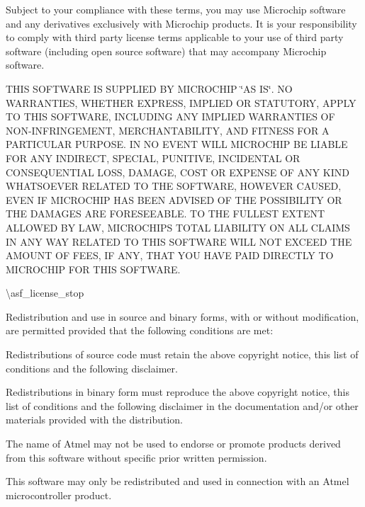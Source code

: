 Subject to your compliance with these terms, you may use Microchip software and any derivatives exclusively with Microchip products. It is your responsibility to comply with third party license terms applicable to your use of third party software (including open source software) that may accompany Microchip software.

T\+H\+IS S\+O\+F\+T\+W\+A\+RE IS S\+U\+P\+P\+L\+I\+ED BY M\+I\+C\+R\+O\+C\+H\+IP \char`\"{}\+A\+S I\+S\char`\"{}. NO W\+A\+R\+R\+A\+N\+T\+I\+ES, W\+H\+E\+T\+H\+ER E\+X\+P\+R\+E\+SS, I\+M\+P\+L\+I\+ED OR S\+T\+A\+T\+U\+T\+O\+RY, A\+P\+P\+LY TO T\+H\+IS S\+O\+F\+T\+W\+A\+RE, I\+N\+C\+L\+U\+D\+I\+NG A\+NY I\+M\+P\+L\+I\+ED W\+A\+R\+R\+A\+N\+T\+I\+ES OF N\+O\+N-\/\+I\+N\+F\+R\+I\+N\+G\+E\+M\+E\+NT, M\+E\+R\+C\+H\+A\+N\+T\+A\+B\+I\+L\+I\+TY, A\+ND F\+I\+T\+N\+E\+SS F\+OR A P\+A\+R\+T\+I\+C\+U\+L\+AR P\+U\+R\+P\+O\+SE. IN NO E\+V\+E\+NT W\+I\+LL M\+I\+C\+R\+O\+C\+H\+IP BE L\+I\+A\+B\+LE F\+OR A\+NY I\+N\+D\+I\+R\+E\+CT, S\+P\+E\+C\+I\+AL, P\+U\+N\+I\+T\+I\+VE, I\+N\+C\+I\+D\+E\+N\+T\+AL OR C\+O\+N\+S\+E\+Q\+U\+E\+N\+T\+I\+AL L\+O\+SS, D\+A\+M\+A\+GE, C\+O\+ST OR E\+X\+P\+E\+N\+SE OF A\+NY K\+I\+ND W\+H\+A\+T\+S\+O\+E\+V\+ER R\+E\+L\+A\+T\+ED TO T\+HE S\+O\+F\+T\+W\+A\+RE, H\+O\+W\+E\+V\+ER C\+A\+U\+S\+ED, E\+V\+EN IF M\+I\+C\+R\+O\+C\+H\+IP H\+AS B\+E\+EN A\+D\+V\+I\+S\+ED OF T\+HE P\+O\+S\+S\+I\+B\+I\+L\+I\+TY OR T\+HE D\+A\+M\+A\+G\+ES A\+RE F\+O\+R\+E\+S\+E\+E\+A\+B\+LE. TO T\+HE F\+U\+L\+L\+E\+ST E\+X\+T\+E\+NT A\+L\+L\+O\+W\+ED BY L\+AW, M\+I\+C\+R\+O\+C\+H\+IP\textquotesingle{}S T\+O\+T\+AL L\+I\+A\+B\+I\+L\+I\+TY ON A\+LL C\+L\+A\+I\+MS IN A\+NY W\+AY R\+E\+L\+A\+T\+ED TO T\+H\+IS S\+O\+F\+T\+W\+A\+RE W\+I\+LL N\+OT E\+X\+C\+E\+ED T\+HE A\+M\+O\+U\+NT OF F\+E\+ES, IF A\+NY, T\+H\+AT Y\+OU H\+A\+VE P\+A\+ID D\+I\+R\+E\+C\+T\+LY TO M\+I\+C\+R\+O\+C\+H\+IP F\+OR T\+H\+IS S\+O\+F\+T\+W\+A\+RE.

\textbackslash{}asf\+\_\+license\+\_\+stop

Redistribution and use in source and binary forms, with or without modification, are permitted provided that the following conditions are met\+:


\begin{DoxyEnumerate}
\item Redistributions of source code must retain the above copyright notice, this list of conditions and the following disclaimer.
\item Redistributions in binary form must reproduce the above copyright notice, this list of conditions and the following disclaimer in the documentation and/or other materials provided with the distribution.
\item The name of Atmel may not be used to endorse or promote products derived from this software without specific prior written permission.
\item This software may only be redistributed and used in connection with an Atmel microcontroller product.
\end{DoxyEnumerate}

